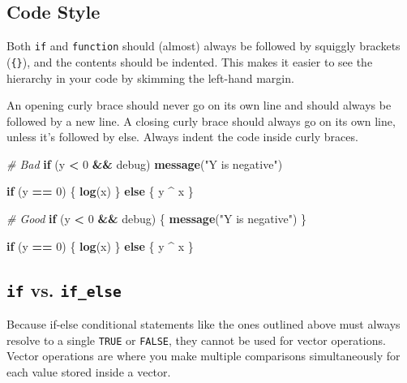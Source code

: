 \documentclass[]{book}
\newenvironment{Shaded}{\begin{snugshade}}{\end{snugshade}}
\newcommand{\KeywordTok}[1]{\textcolor[rgb]{0.13,0.29,0.53}{\textbf{#1}}}
\newcommand{\DecValTok}[1]{\textcolor[rgb]{0.00,0.00,0.81}{#1}}
\newcommand{\StringTok}[1]{\textcolor[rgb]{0.31,0.60,0.02}{#1}}
\newcommand{\CommentTok}[1]{\textcolor[rgb]{0.56,0.35,0.01}{\textit{#1}}}
\newcommand{\ControlFlowTok}[1]{\textcolor[rgb]{0.13,0.29,0.53}{\textbf{#1}}}
\newcommand{\OperatorTok}[1]{\textcolor[rgb]{0.81,0.36,0.00}{\textbf{#1}}}
\newcommand{\NormalTok}[1]{#1}
\begin{document}
\subsection{Code Style}\label{code-style}

Both \texttt{if} and \texttt{function} should (almost) always be
followed by squiggly brackets (\texttt{\{\}}), and the contents should
be indented. This makes it easier to see the hierarchy in your code by
skimming the left-hand margin.

An opening curly brace should never go on its own line and should always
be followed by a new line. A closing curly brace should always go on its
own line, unless it's followed by else. Always indent the code inside
curly braces.

\begin{Shaded}
\begin{Highlighting}[]
\CommentTok{# Bad}
\ControlFlowTok{if}\NormalTok{ (y }\OperatorTok{<}\StringTok{ }\DecValTok{0} \OperatorTok{&&}\StringTok{ }\NormalTok{debug)}
\KeywordTok{message}\NormalTok{(}\StringTok{"Y is negative"}\NormalTok{)}

\ControlFlowTok{if}\NormalTok{ (y }\OperatorTok{==}\StringTok{ }\DecValTok{0}\NormalTok{) \{}
  \KeywordTok{log}\NormalTok{(x)}
\NormalTok{\} }
\ControlFlowTok{else}\NormalTok{ \{}
\NormalTok{  y }\OperatorTok{^}\StringTok{ }\NormalTok{x}
\NormalTok{\}}

\CommentTok{# Good}
\ControlFlowTok{if}\NormalTok{ (y }\OperatorTok{<}\StringTok{ }\DecValTok{0} \OperatorTok{&&}\StringTok{ }\NormalTok{debug) \{}
  \KeywordTok{message}\NormalTok{(}\StringTok{"Y is negative"}\NormalTok{)}
\NormalTok{\}}

\ControlFlowTok{if}\NormalTok{ (y }\OperatorTok{==}\StringTok{ }\DecValTok{0}\NormalTok{) \{}
  \KeywordTok{log}\NormalTok{(x)}
\NormalTok{\} }\ControlFlowTok{else}\NormalTok{ \{}
\NormalTok{  y }\OperatorTok{^}\StringTok{ }\NormalTok{x}
\NormalTok{\}}
\end{Highlighting}
\end{Shaded}

\subsection{\texorpdfstring{\texttt{if} vs.
\texttt{if\_else}}{if vs. if\_else}}\label{if-vs.-if_else}

Because if-else conditional statements like the ones outlined above must
always resolve to a single \texttt{TRUE} or \texttt{FALSE}, they cannot
be used for vector operations. Vector operations are where you make
multiple comparisons simultaneously for each value stored inside a
vector.
\end{document}
